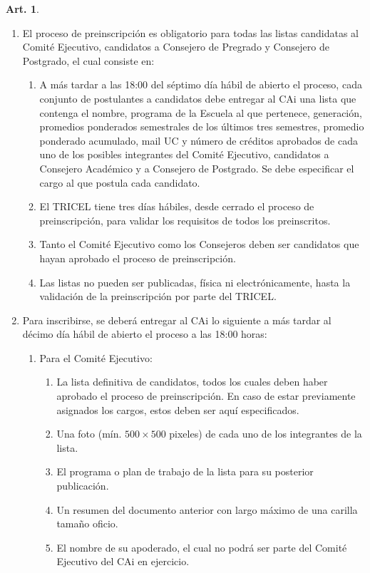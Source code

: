 \documentclass[letterpaper,11pt]{article}
\theoremstyle{definition}%
\newtheorem{art}{Art.} %
\begin{document}
\begin{art}
\begin{enumerate}
		\item El proceso de preinscripción es obligatorio para todas las listas candidatas al Comité Ejecutivo, candidatos a Consejero de Pregrado y Consejero de Postgrado, el cual consiste en:
		      \begin{enumerate}
			      \item A más tardar a las 18:00 del séptimo día hábil de abierto el proceso, cada conjunto
			            de postulantes a candidatos debe entregar al CAi una lista que contenga el nombre, programa de la Escuela al que pertenece, generación, promedios ponderados semestrales de los últimos tres semestres, promedio ponderado acumulado, mail UC y número de créditos aprobados de cada uno de los posibles integrantes del Comité Ejecutivo, candidatos a Consejero Académico y a Consejero de Postgrado. Se debe especificar el cargo al que postula cada candidato.

			      \item El TRICEL tiene tres días hábiles, desde cerrado el proceso de preinscripción, para validar los requisitos de todos los preinscritos.

			      \item Tanto el Comité Ejecutivo como los Consejeros deben ser candidatos que hayan aprobado el proceso de preinscripción.

			      \item Las listas no pueden ser publicadas, física ni electrónicamente, hasta la validación de la preinscripción por parte del TRICEL\@.
		      \end{enumerate}

		\item Para inscribirse, se deberá entregar al CAi lo siguiente a más tardar al décimo día hábil de abierto el proceso a las 18:00 horas:
		      \begin{enumerate}
			      \item Para el Comité Ejecutivo:
			            \begin{enumerate}
				            \item La lista definitiva de candidatos, todos los cuales deben haber aprobado el proceso de preinscripción. En caso de estar previamente asignados los cargos, estos deben ser aquí especificados.
				            \item\label{foto} Una foto (mín. $500 \times 500$ pixeles) de cada uno de los integrantes de la lista.
				            \item El programa o plan de trabajo de la lista para su posterior publicación.
				            \item Un resumen del documento anterior con largo máximo de una carilla tamaño oficio.
				            \item El nombre de su apoderado, el cual no podrá ser parte del Comité Ejecutivo del CAi en ejercicio.
			            \end{enumerate}


\end{enumerate}
\end{enumerate}
\end{art}
\end{document}
